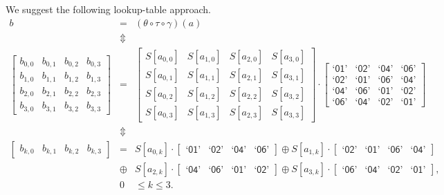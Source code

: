 \documentclass{llncs}
\newcommand{\gf}[1]{\textsf{`#1'}}
\begin{document}
We suggest the following lookup-table approach.
\begin{eqnarray*}
b &=& (\theta \circ \tau \circ \gamma) (a) \\
 & \Updownarrow & \\
\left[ \begin{array}{cccc}
b_{0,0} & b_{0,1} & b_{0,2} & b_{0,3} \\
b_{1,0} & b_{1,1} & b_{1,2} & b_{1,3} \\
b_{2,0} & b_{2,1} & b_{2,2} & b_{2,3} \\
b_{3,0} & b_{3,1} & b_{3,2} & b_{3,3}
 \end{array} \right]
 &=&
\left[ \begin{array}{cccc}
S[a_{0,0}] & S[a_{1,0}] & S[a_{2,0}] & S[a_{3,0}] \\
S[a_{0,1}] & S[a_{1,1}] & S[a_{2,1}] & S[a_{3,1}] \\
S[a_{0,2}] & S[a_{1,2}] & S[a_{2,2}] & S[a_{3,2}] \\
S[a_{0,3}] & S[a_{1,3}] & S[a_{2,3}] & S[a_{3,3}]
 \end{array} \right]  \cdot
\left[ \begin{array}{cccc}
\gf{01} & \gf{02} & \gf{04} & \gf{06}\\
\gf{02} & \gf{01} & \gf{06} & \gf{04}\\
\gf{04} & \gf{06} & \gf{01} & \gf{02}\\
\gf{06} & \gf{04} & \gf{02} & \gf{01}
\end{array} \right] \\
& \Updownarrow & \\
\left[ \begin{array}{cccc} b_{k,0} & b_{k,1} & b_{k,2} & b_{k,3} \end{array} \right] &=& %
 S[a_{0,k}] \cdot [ \begin{array}{cccc} \gf{01} & \gf{02} & \gf{04} & \gf{06} \end{array} ] \oplus %
 S[a_{1,k}] \cdot [ \begin{array}{cccc} \gf{02} & \gf{01} & \gf{06} & \gf{04} \end{array} ] \\
 & \oplus &
 S[a_{2,k}] \cdot [ \begin{array}{cccc} \gf{04} & \gf{06} & \gf{01} & \gf{02} \end{array} ] \oplus %
 S[a_{3,k}] \cdot [ \begin{array}{cccc} \gf{06} & \gf{04} & \gf{02} & \gf{01} \end{array} ],\\
& 0 & \leqslant k \leqslant 3.
\end{eqnarray*}
\end{document}
